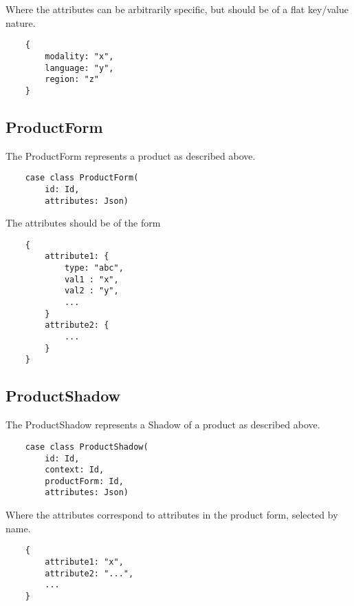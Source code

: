 \documentclass[11pt]{article}
\begin{document}
Where the attributes can be arbitrarily specific, but should be of a flat key/value nature.

\begin{lstlisting}
    {
        modality: "x",
        language: "y",
        region: "z"
    }
\end{lstlisting}


\subsection{ProductForm}

The ProductForm represents a product as described above. 

\begin{lstlisting}
    case class ProductForm(
        id: Id,
        attributes: Json)
\end{lstlisting}

The attributes should be of the form
\begin{lstlisting}
    {
        attribute1: {
            type: "abc",
            val1 : "x",
            val2 : "y",
            ...
        }
        attribute2: {
            ...
        }
    }
\end{lstlisting}

\subsection{ProductShadow}

The ProductShadow represents a Shadow of a product as described above. 

\begin{lstlisting}
    case class ProductShadow(
        id: Id,
        context: Id,
        productForm: Id,
        attributes: Json)
\end{lstlisting}

Where the attributes correspond to attributes in the product form, selected by
name.

\begin{lstlisting}
    {
        attribute1: "x",
        attribute2: "...",
        ...
    }
\end{lstlisting}
\end{document}
